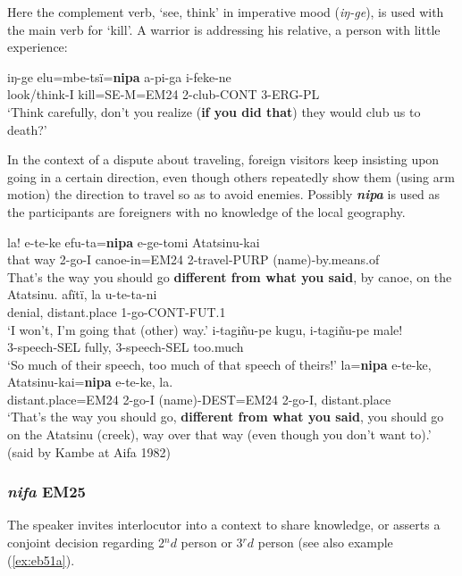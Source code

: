\documentclass[output=paper]{langsci/langscibook}
\begin{document}
Here the complement verb, ‘see, think’ in imperative mood (\textit{iŋ-ge}), is used with the main  verb for ‘kill’.  A warrior is addressing his relative, a person with little experience:

\begin{exe}
	\ex \label{ex:eb60}
	\gll iŋ-ge elu=mbe-tsï=\textbf{nipa} a-pi-ga i-feke-ne\\
	look/think-I kill=SE-M=EM24 2-club-CONT 3-ERG-PL\\
	\trans ‘Think carefully, don’t you realize (\textbf{if you did that}) they would club us to death?’
\end{exe}

In the context of a dispute about traveling, foreign visitors keep insisting upon going in a certain direction, even though others repeatedly show them (using arm motion)  the direction to travel so as to avoid enemies. Possibly \textbf{\textit{nipa}} is used as the participants are foreigners with no knowledge of the local geography. 

\begin{exe}
\ex \label{ex:eb61}
	\begin{xlist}
	\ex 
	\gll la! e-te-ke efu-ta=\textbf{nipa} e-ge-tomi Atatsinu-kai\\
	{that way} 2-go-I canoe-in=EM24 2-travel-PURP (name)-by.means.of\\
	\trans That’s the way you should go \textbf{different from what you said}, by canoe, on the Atatsinu.
	\ex 
	\gll afïtï, la u-te-ta-ni\\
	denial, distant.place 1-go-CONT-FUT.1\\
	\trans ‘I won’t, I’m going that (other) way.’
	\ex
	\gll i-tagiñu-pe kugu, i-tagiñu-pe male!\\
	3-speech-SEL fully, 3-speech-SEL too.much\\
	\trans ‘So much of their speech,  too much of that speech of theirs!'
	\ex
	\gll la=\textbf{nipa} e-te-ke, Atatsinu-kai=\textbf{nipa} e-te-ke, la.\\
	distant.place=EM24 2-go-I (name)-DEST=EM24 2-go-I, distant.place\\
	\trans ‘That’s the way you should go, \textbf{different from what you said},  you should go on the Atatsinu (creek),   way over that way (even though you don’t want to).’ (said by Kambe at Aifa 1982)
\end{xlist}
\end{exe}

\subsubsection{\textit{nifa} EM25} 
The speaker invites interlocutor into a context to share knowledge, or asserts a conjoint decision regarding 2$^nd$ person or 3$^rd$ person  (see also example (\ref{ex:eb51a}).
\end{document}
